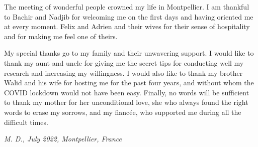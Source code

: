 The meeting of wonderful people crowned my life in Montpellier. I am thankful to Bachir and Nadjib for welcoming me on the first days and having oriented me at every moment. Felix and Adrien and their wives for their sense of hospitality and for making me feel one of theirs. 

My special thanks go to my family and their unwavering support. I would like to thank my aunt and uncle for giving me the secret tips for conducting well my research and increasing my willingness. I would also like to thank my brother Walid and his wife for hosting me for the past four years, and without whom the COVID lockdown would not have been easy. Finally, no words will be sufficient to thank my mother for her unconditional love, she who always found the right words to erase my sorrows, and my fiancée, who supported me during all the difficult times. 

   



\medskip

\noindent
\textit{M. D., July 2022, Montpellier, France}